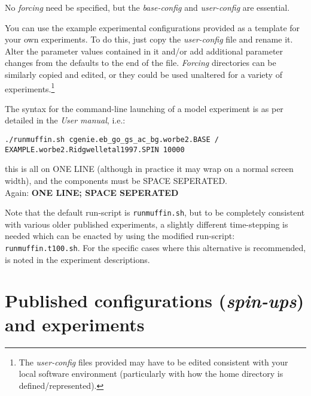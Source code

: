 \documentclass[10pt,twoside]{article}
\begin{document}
        No \textit{forcing} need be specified, but the \textit{base-config} and \textit{user-config} are essential.
        
\noindent You can use the example experimental configurations provided as a template for your own experiments. To do this, just copy the \textit{user-config} file and rename it. Alter the parameter values contained in it and/or add additional parameter changes from the defaults to the end of the file. \textit{Forcing} directories can be similarly copied and edited, or they could be used unaltered for a variety of experiments.\footnote{The \textit{user-config} files provided may have to be edited consistent with your local software environment (particularly with how the home directory is defined/represented).}

\noindent The syntax for the command-line launching of a model experiment is as per detailed in the \textit{User manual}, i.e.:
\vspace{-5pt}\begin{verbatim}./runmuffin.sh cgenie.eb_go_gs_ac_bg.worbe2.BASE /
EXAMPLE.worbe2.Ridgwelletal1997.SPIN 10000
\end{verbatim}\vspace{-5pt}
this is all on ONE LINE (although in practice it may wrap on a normal screen width), and the components must be SPACE SEPERATED.
\\Again: \textbf{ONE LINE; SPACE SEPERATED}

Note that the default run-script is \texttt{runmuffin.sh}, but to be completely consistent with various older published experiments, a slightly different time-stepping is needed which can be enacted by using the modified run-script: \texttt{runmuffin.t100.sh}. For the specific cases where this alternative is recommended, is noted in the experiment descriptions.


\newpage
\section{Published configurations (\textit{spin-ups}) and experiments}\label{published}
\end{document}
